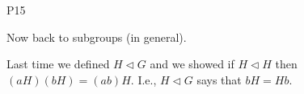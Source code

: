 \documentclass{article}
\begin{document}
\begin{cprop}{P15}{}
\begin{enumerate}
\begin{cpf}{}{}
            \end{cpf}
    \end{enumerate}
\end{cprop}

Now back to subgroups (in general). 

Last time we defined $H \triangleleft G$ and we showed if $H \triangleleft H$ then $(aH)(bH) = (ab)H$. I.e., $H \triangleleft G$ says that $bH = Hb$. 
\end{document}

